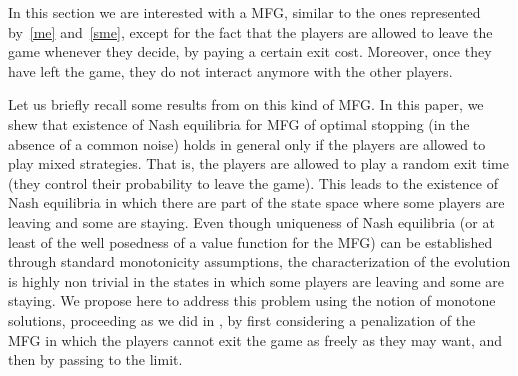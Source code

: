 \documentclass[JEP,XML,SOM,Unicode,NoEqCountersInSection,published]{cedram}
\theoremstyle{definition}
\begin{document}
In this section we are interested with a MFG, similar to the ones represented by~\eqref{me} and~\eqref{sme}, except for the fact that the players are allowed to leave the game whenever they decide, by paying a certain exit cost. Moreover, once they have left the game, they do not interact anymore with the other players.

Let us briefly recall some results from \cite{bertucci2018optimal} on this kind of MFG. In this paper, we shew that existence of Nash equilibria for MFG of optimal stopping (in the absence of a common noise) holds in general only if the players are allowed to play mixed strategies. That is, the players are allowed to play a random exit time (\ie they control their probability to leave the game). This leads to the existence of Nash equilibria in which there are part of the state space where some players are leaving and some are staying. Even though uniqueness of Nash equilibria (or at least of the well posedness of a value function for the MFG) can be established through standard monotonicity assumptions, the characterization of the evolution is highly non trivial in the states in which some players are leaving and some are staying. We propose here to address this problem using the notion of monotone solutions, proceeding as we did in \cite{bertucci2018optimal}, by first considering a penalization of the MFG in which the players cannot exit the game as freely as they may want, and then by passing to the limit.
\end{document}
